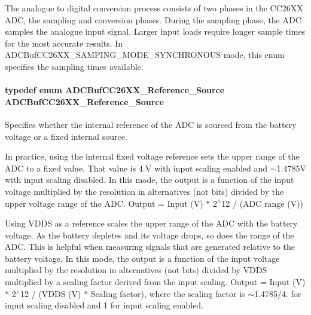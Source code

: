 The analogue to digital conversion process consists of two phases in the C\+C26\+X\+X A\+D\+C, the sampling and conversion phases. During the sampling phase, the A\+D\+C samples the analogue input signal. Larger input loads require longer sample times for the most accurate results. In A\+D\+C\+Buf\+C\+C26\+X\+X\+\_\+\+S\+A\+M\+P\+I\+N\+G\+\_\+\+M\+O\+D\+E\+\_\+\+S\+Y\+N\+C\+H\+R\+O\+N\+O\+U\+S mode, this enum specifies the sampling times available. 
\paragraph[{A\+D\+C\+Buf\+C\+C26\+X\+X\+\_\+\+Reference\+\_\+\+Source}]{\setlength{\rightskip}{0pt plus 5cm}typedef enum {\bf A\+D\+C\+Buf\+C\+C26\+X\+X\+\_\+\+Reference\+\_\+\+Source}  {\bf A\+D\+C\+Buf\+C\+C26\+X\+X\+\_\+\+Reference\+\_\+\+Source}}\label{_a_d_c_buf_c_c26_x_x_8h_a55267edc4a4440dd55b97f3384474f80}


Specifies whether the internal reference of the A\+D\+C is sourced from the battery voltage or a fixed internal source. 


\begin{DoxyItemize}
\item In practice, using the internal fixed voltage reference sets the upper range of the A\+D\+C to a fixed value. That value is 4.\+V with input scaling enabled and $\sim$1.4785\+V with input scaling disabled. In this mode, the output is a function of the input voltage multiplied by the resolution in alternatives (not bits) divided by the upper voltage range of the A\+D\+C. Output = Input (V) $\ast$ 2$^\wedge$12 / (A\+D\+C range (V))
\item Using V\+D\+D\+S as a reference scales the upper range of the A\+D\+C with the battery voltage. As the battery depletes and its voltage drops, so does the range of the A\+D\+C. This is helpful when measuring signals that are generated relative to the battery voltage. In this mode, the output is a function of the input voltage multiplied by the resolution in alternatives (not bits) divided by V\+D\+D\+S multiplied by a scaling factor derived from the input scaling. Output = Input (V) $\ast$ 2$^\wedge$12 / (V\+D\+D\+S (V) $\ast$ Scaling factor), where the scaling factor is $\sim$1.4785/4. for input scaling disabled and 1 for input scaling enabled.
\end{DoxyItemize}

